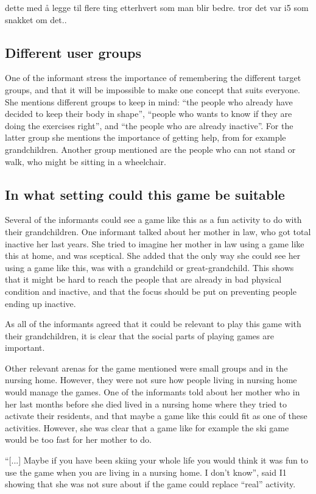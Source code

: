dette med å legge til flere ting etterhvert som man blir bedre. tror det var i5 som snakket om det..

\subsection{Different user groups}
One of the informant stress the importance of remembering the different target groups, and that it will be impossible to make one concept that suits everyone. She mentions different groups to keep in mind: “the people who already have decided to keep their body in shape”, “people who wants to know if they are doing the exercises right”, and “the people who are already inactive”. For the latter group she mentions the importance of getting help, from for example grandchildren.  Another group mentioned are the people who can not stand or walk, who might be sitting in a wheelchair. 

\subsection{In what setting could this game be suitable}
Several of the informants could see a game like this as a fun activity to do with their grandchildren. One informant talked about her mother in law, who got total inactive her last years. She tried to imagine her mother in law using a game like this at home, and was sceptical. She added that the only way she could see her using a game like this, was with a grandchild or great-grandchild. This shows that it might be hard to reach the people that are already in bad physical condition and inactive, and that the focus should be put on preventing people ending up inactive. 

As all of the informants agreed that it could be relevant to play this game with their grandchildren, it is clear that the social parts of playing games are important. 

Other relevant arenas for the game mentioned were small groups and in the nursing home. However, they were not sure how people living in nursing home would manage the games. One of the informants told about her mother who in her last months before she died lived in a nursing home where they tried to activate their residents, and that maybe a game like this could fit as one of these activities. However, she was clear that a  game like for example the ski game would be too fast for her mother to do. 

“[...] Maybe if you have been skiing your whole life you would think it was fun to use the game when you are living in a nursing home. I don't know”, said I1 showing that she was not sure about if the game could replace “real” activity. 

